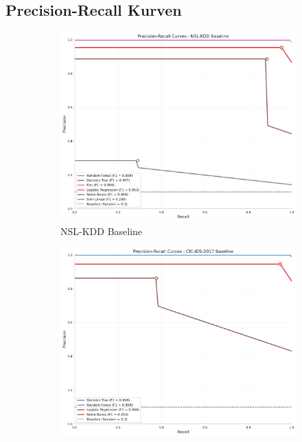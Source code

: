 \documentclass[11pt,a4paper]{article}
\begin{document}
    \subsection{Precision-Recall Kurven}
    \label{app:pr_curves}
    
    \begin{figure}[H]
        \centering
        \begin{subfigure}[b]{0.48\textwidth}
            \includegraphics[width=\textwidth]{../data/results/precision_recall_curves/nsl_kdd_baseline_scientific_pr.pdf}
            \caption{NSL-KDD Baseline}
        \end{subfigure}
        \hfill
        \begin{subfigure}[b]{0.48\textwidth}
            \includegraphics[width=\textwidth]{../data/results/precision_recall_curves/cic_ids_2017_baseline_scientific_pr.pdf}

\end{subfigure}
\end{figure}
\end{document}

